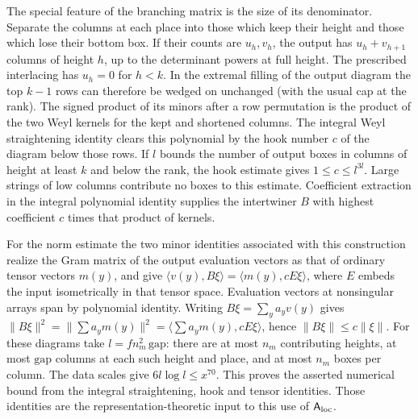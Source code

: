 The special feature of the branching matrix is the size of its denominator. Separate the columns at each place into those which keep their height and those which lose their bottom box. If their counts are $u_h,v_h$, the output has $u_h+v_{h+1}$ columns of height $h$, up to the determinant powers at full height. The prescribed interlacing has $u_h=0$ for $h<k$. In the extremal filling of the output diagram the top $k-1$ rows can therefore be wedged on unchanged (with the usual cap at the rank). The signed product of its minors after a row permutation is the product of the two Weyl kernels for the kept and shortened columns. The integral Weyl straightening identity clears this polynomial by the hook number $c$ of the diagram below those rows. If $l$ bounds the number of output boxes in columns of height at least $k$ and below the rank, the hook estimate gives $1\le c\le l^{3l}$. Large strings of low columns contribute no boxes to this estimate. Coefficient extraction in the integral polynomial identity supplies the intertwiner $B$ with highest coefficient $c$ times that product of kernels.

For the norm estimate the two minor identities associated with this construction realize the Gram matrix of the output evaluation vectors as that of ordinary tensor vectors $m(y)$, and give
$\langle v(y),B\xi\rangle=\langle m(y),c E\xi\rangle$, where $E$ embeds the input isometrically in that tensor space. Evaluation vectors at nonsingular arrays span by polynomial identity. Writing $B\xi=\sum_y a_yv(y)$ gives $\|B\xi\|^2=\|\sum a_y m(y)\|^2=\langle\sum a_y m(y),cE\xi\rangle$, hence $\|B\xi\|\le c\|\xi\|$. For these diagrams take $l=fn_m^2\,\mathrm{gap}$: there are at most $n_m$ contributing heights, at most $\mathrm{gap}$ columns at each such height and place, and at most $n_m$ boxes per column. The data scales give $6l\log l\le x^{70}$. This proves the asserted numerical bound from the integral straightening, hook and tensor identities. Those identities are the representation-theoretic input to this use of $\mathsf A_{\rm loc}$.

